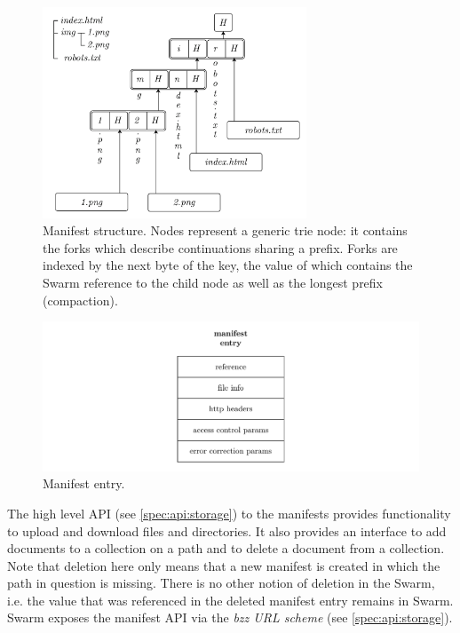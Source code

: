 \begin{figure}[htbp]
\centering
\includegraphics[width=0.7\textwidth]{fig/manifest-structure.pdf}
\caption[Manifest structure \statusgreen]{Manifest structure. Nodes represent a generic trie node: it contains the forks which describe continuations sharing a prefix. Forks are indexed by the next byte of the key, the value of which contains the Swarm reference to the child node as well as the longest prefix (compaction).}
\label{fig:manifest-structure}
\end{figure}

\begin{figure}[htbp]
\centering
\includegraphics[width=\textwidth]{fig/manifest-entry.pdf}
\caption[Manifest entry \statusgreen]{Manifest entry.}
\label{fig:manifest-entry}
\end{figure}

The high level API (see \ref{spec:api:storage}) to the manifests provides functionality to upload and download files and directories. It also provides an interface to add documents to a collection on a path and to delete a document from a collection. Note that deletion here only means that a new manifest is created in which the path in question is missing. There is no other notion of deletion in the Swarm, i.e. the value that was referenced in the deleted manifest entry remains in Swarm. Swarm exposes the manifest API via the \emph{bzz URL scheme} (see \ref{spec:api:storage}).

